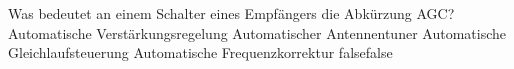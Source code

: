     {Was bedeutet an einem Schalter eines Empfängers die Abkürzung AGC?}
    {Automatische Verstärkungsregelung}
    {Automatischer Antennentuner}
    {Automatische Gleichlaufsteuerung}
    {Automatische Frequenzkorrektur}
    {false}{false}